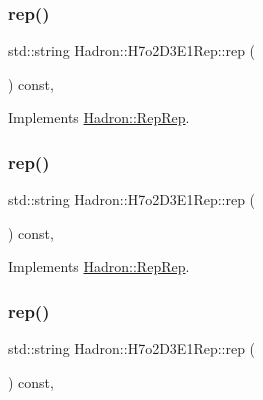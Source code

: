 \subsubsection{\texorpdfstring{rep()}{rep()}\hspace{0.1cm}{\footnotesize\ttfamily [1/3]}}
{\footnotesize\ttfamily std\+::string Hadron\+::\+H7o2\+D3\+E1\+Rep\+::rep (\begin{DoxyParamCaption}{ }\end{DoxyParamCaption}) const\hspace{0.3cm}{\ttfamily [inline]}, {\ttfamily [virtual]}}



Implements \mbox{\hyperlink{structHadron_1_1RepRep_ab3213025f6de249f7095892109575fde}{Hadron\+::\+Rep\+Rep}}.

\mbox{\label{structHadron_1_1H7o2D3E1Rep_a9b7fbb0d47650cdab86b3bb9832bbe75}} 
\subsubsection{\texorpdfstring{rep()}{rep()}\hspace{0.1cm}{\footnotesize\ttfamily [2/3]}}
{\footnotesize\ttfamily std\+::string Hadron\+::\+H7o2\+D3\+E1\+Rep\+::rep (\begin{DoxyParamCaption}{ }\end{DoxyParamCaption}) const\hspace{0.3cm}{\ttfamily [inline]}, {\ttfamily [virtual]}}



Implements \mbox{\hyperlink{structHadron_1_1RepRep_ab3213025f6de249f7095892109575fde}{Hadron\+::\+Rep\+Rep}}.

\mbox{\label{structHadron_1_1H7o2D3E1Rep_a9b7fbb0d47650cdab86b3bb9832bbe75}} 
\subsubsection{\texorpdfstring{rep()}{rep()}\hspace{0.1cm}{\footnotesize\ttfamily [3/3]}}
{\footnotesize\ttfamily std\+::string Hadron\+::\+H7o2\+D3\+E1\+Rep\+::rep (\begin{DoxyParamCaption}{ }\end{DoxyParamCaption}) const\hspace{0.3cm}{\ttfamily [inline]}, {\ttfamily [virtual]}}



